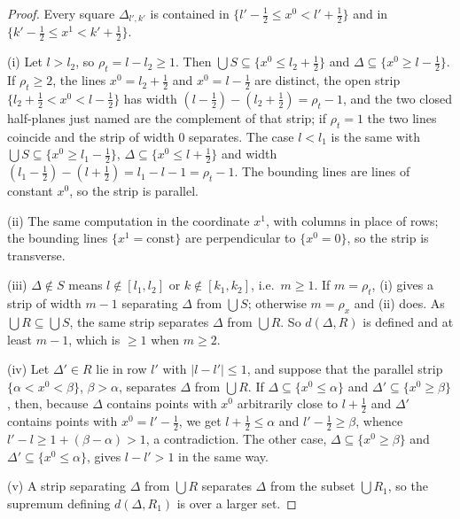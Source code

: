 \documentclass[11pt,a4paper]{article}
\theoremstyle{plain}
\theoremstyle{definition}
\theoremstyle{plain}
\theoremstyle{definition}
\begin{document}
\begin{proof}
Every square $\Delta_{l',k'}$ is contained in $\{l'-\frac12\le x^0<l'+\frac12\}$ and in
$\{k'-\frac12\le x^1<k'+\frac12\}$.

(i) Let $l>l_2$, so $\rho_t=l-l_2\ge1$.  Then $\bigcup S\subseteq\{x^0\le l_2+\frac12\}$ and
$\Delta\subseteq\{x^0\ge l-\frac12\}$.  If $\rho_t\ge2$, the lines $x^0=l_2+\frac12$ and
$x^0=l-\frac12$ are distinct, the open strip $\{l_2+\frac12<x^0<l-\frac12\}$ has width
$(l-\frac12)-(l_2+\frac12)=\rho_t-1$, and the two closed half-planes just named are the
complement of that strip; if $\rho_t=1$ the two lines coincide and the strip of width $0$
separates.  The case $l<l_1$ is the same with $\bigcup S\subseteq\{x^0\ge l_1-\frac12\}$,
$\Delta\subseteq\{x^0\le l+\frac12\}$ and width $(l_1-\frac12)-(l+\frac12)=l_1-l-1=\rho_t-1$.
The bounding lines are lines of constant $x^0$, so the strip is parallel.

(ii) The same computation in the coordinate $x^1$, with columns in place of rows; the
bounding lines $\{x^1=\text{const}\}$ are perpendicular to $\{x^0=0\}$, so the strip is
transverse.

(iii) $\Delta\notin S$ means $l\notin[l_1,l_2]$ or $k\notin[k_1,k_2]$, i.e.\ $m\ge1$.  If
$m=\rho_t$, (i) gives a strip of width $m-1$ separating $\Delta$ from $\bigcup S$;
otherwise $m=\rho_x$ and (ii) does.  As $\bigcup R\subseteq\bigcup S$, the same strip
separates $\Delta$ from $\bigcup R$.  So $d(\Delta,R)$ is defined and at least $m-1$, which
is $\ge1$ when $m\ge2$.

(iv) Let $\Delta'\in R$ lie in row $l'$ with $|l-l'|\le1$, and suppose that the parallel
strip $\{\alpha<x^0<\beta\}$, $\beta>\alpha$, separates $\Delta$ from $\bigcup R$.  If
$\Delta\subseteq\{x^0\le\alpha\}$ and $\Delta'\subseteq\{x^0\ge\beta\}$, then, because
$\Delta$ contains points with $x^0$ arbitrarily close to $l+\frac12$ and $\Delta'$ contains
points with $x^0=l'-\frac12$, we get $l+\frac12\le\alpha$ and $l'-\frac12\ge\beta$, whence
$l'-l\ge1+(\beta-\alpha)>1$, a contradiction.  The other case,
$\Delta\subseteq\{x^0\ge\beta\}$ and $\Delta'\subseteq\{x^0\le\alpha\}$, gives
$l-l'>1$ in the same way.

(v) A strip separating $\Delta$ from $\bigcup R$ separates $\Delta$ from the subset
$\bigcup R_1$, so the supremum defining $d(\Delta,R_1)$ is over a larger set.
\end{proof}
\end{document}
